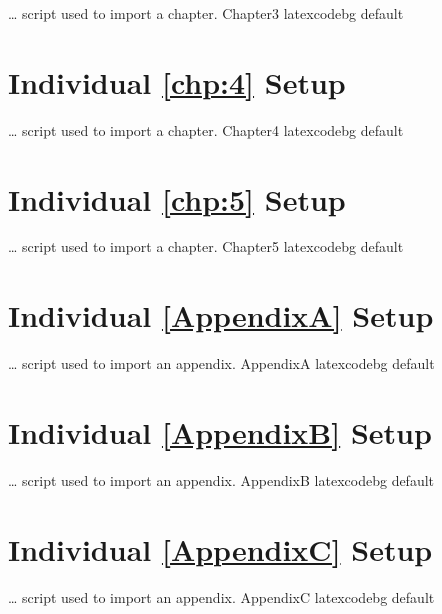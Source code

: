 \documentclass[../Dissertation]{subfiles}
\begin{document}
        {}
        {\ldots {} script used to import a chapter.}
        {Chapter3}
        {\footnotesize}
        {latexcodebg}
        {default}

\section{Individual \cref{chp:4} Setup}

        {}
        {\ldots {} script used to import a chapter.}
        {Chapter4}
        {\footnotesize}
        {latexcodebg}
        {default}

\section{Individual \cref{chp:5} Setup}

        {}
        {\ldots {} script used to import a chapter.}
        {Chapter5}
        {\footnotesize}
        {latexcodebg}
        {default}

\section{Individual \cref{AppendixA} Setup}

        {}
        {\ldots {} script used to import an appendix.}
        {AppendixA}
        {\footnotesize}
        {latexcodebg}
        {default}

\section{Individual \cref{AppendixB} Setup}

        {}
        {\ldots {} script used to import an appendix.}
        {AppendixB}
        {\footnotesize}
        {latexcodebg}
        {default}

\section{Individual \cref{AppendixC} Setup}

        {}
        {\ldots {} script used to import an appendix.}
        {AppendixC}
        {\footnotesize}
        {latexcodebg}
        {default}
\end{document}
